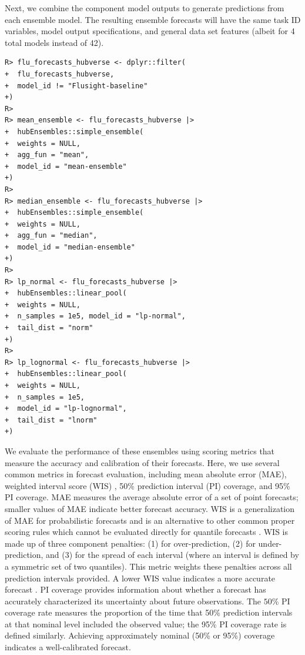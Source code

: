 \documentclass[
  article,
  shortnames,
  notitle]{jss}
\begin{document}
Next, we combine the component model outputs to generate predictions
from each ensemble model. The resulting ensemble forecasts will have the
same task ID variables, model output specifications, and general data
set features (albeit for 4 total models instead of 42).

\begin{verbatim}
R> flu_forecasts_hubverse <- dplyr::filter(
+  flu_forecasts_hubverse,
+  model_id != "Flusight-baseline"
+)
R> 
R> mean_ensemble <- flu_forecasts_hubverse |>
+  hubEnsembles::simple_ensemble(
+  weights = NULL,
+  agg_fun = "mean",
+  model_id = "mean-ensemble"
+)
R> 
R> median_ensemble <- flu_forecasts_hubverse |>
+  hubEnsembles::simple_ensemble(
+  weights = NULL,
+  agg_fun = "median",
+  model_id = "median-ensemble"
+)
R> 
R> lp_normal <- flu_forecasts_hubverse |>
+  hubEnsembles::linear_pool(
+  weights = NULL,
+  n_samples = 1e5, model_id = "lp-normal",
+  tail_dist = "norm"
+)
R> 
R> lp_lognormal <- flu_forecasts_hubverse |>
+  hubEnsembles::linear_pool(
+  weights = NULL,
+  n_samples = 1e5,
+  model_id = "lp-lognormal",
+  tail_dist = "lnorm"
+)
\end{verbatim}

We evaluate the performance of these ensembles using scoring metrics
that measure the accuracy and calibration of their forecasts. Here, we
use several common metrics in forecast evaluation, including mean
absolute error (MAE), weighted interval score (WIS)
\citep{bracher_evaluating_2021}, 50\% prediction interval (PI) coverage,
and 95\% PI coverage. MAE measures the average absolute error of a set
of point forecasts; smaller values of MAE indicate better forecast
accuracy. WIS is a generalization of MAE for probabilistic forecasts and
is an alternative to other common proper scoring rules which cannot be
evaluated directly for quantile forecasts
\citep{bracher_evaluating_2021}. WIS is made up of three component
penalties: (1) for over-prediction, (2) for under-prediction, and (3)
for the spread of each interval (where an interval is defined by a
symmetric set of two quantiles). This metric weights these penalties
across all prediction intervals provided. A lower WIS value indicates a
more accurate forecast \citep{bracher_evaluating_2021}. PI coverage
provides information about whether a forecast has accurately
characterized its uncertainty about future observations. The \(50\)\% PI
coverage rate measures the proportion of the time that 50\% prediction
intervals at that nominal level included the observed value; the 95\% PI
coverage rate is defined similarly. Achieving approximately nominal
(50\% or 95\%) coverage indicates a well-calibrated forecast.
\end{document}
